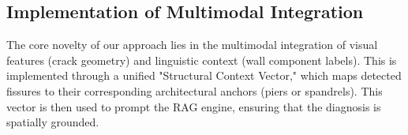 \subsection{Implementation of Multimodal Integration}
\label{subsec:multimodal}

\begin{sloppypar}
The core novelty of our approach lies in the multimodal integration of visual features (crack geometry) and linguistic context (wall component labels). This is implemented through a unified "Structural Context Vector," which maps detected fissures to their corresponding architectural anchors (piers or spandrels). This vector is then used to prompt the RAG engine, ensuring that the diagnosis is spatially grounded.
\end{sloppypar}
